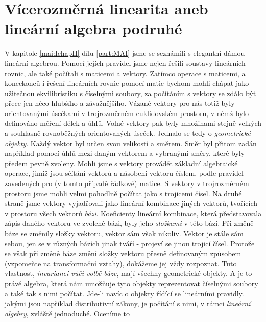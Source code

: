 \setchaptertoc
\chapter{Vícerozměrná linearita aneb lineární algebra podruhé}\label{mai:IIchapI}

  V kapitole \ref{mai:IchapII} dílu \ref{part:MAI} jsme se seznámili s elegantní dámou lineární
  algebrou. Pomocí jejích pravidel jsme nejen řešili soustavy lineárních rovnic, ale také počítali s
  maticemi a vektory. Zatímco operace s maticemi, a koneckonců i řešení lineárních rovnic pomocí
  matic bychom mohli chápat jako užitečnou ekvilibristiku s číselnými soubory, za počítáním s
  vektory se zdálo být přece jen něco hlubšího a závažnějšího. Vázané vektory pro nás totiž byly
  orientovanými úsečkami v trojrozměrném euklidovském prostoru, v němž bylo definováno měření délek
  a úhlů. Volné vektory pak byly množinami stejně velkých a souhlasně rovnoběžných orientovaných
  úseček. Jednalo se tedy o \emph{geometrické objekty}. Každý vektor byl určen svou velikostí a
  směrem. Směr byl přitom zadán například pomocí úhlů mezi daným vektorem a vybranými směry, které
  byly předem pevně zvoleny. Mohli jsme s vektory provádět základní algebraické operace, jimiž jsou
  sčítání vektorů a násobení vektoru číslem, podle pravidel zavedených pro (v tomto případě řádkové)
  matice. S vektory v trojrozměrném prostoru jsme mohli velmi pohodlně počítat jako s trojicemi
  čísel. Na druhé straně jsme vektory vyjadřovali jako lineární kombinace jiných vektorů, tvořících
  v prostoru všech vektorů \emph{bázi}. Koeficienty lineární kombinace, která představovala zápis
  daného vektoru ve zvolené bázi, byly jeho \emph{složkami} v této bázi. Při změně báze se změnily
  složky vektoru, vektor sám však nikoliv. Vektor je stále sám sebou, jen se v různých bázích jinak
  tváří - projeví se jinou trojicí čísel. Protože se však při změně báze změní složky vektoru přesně
  definovaným způsobem (vzpomeňte na transformační vztahy), dokážeme jej vždy rozpoznat. Tuto
  vlastnost, \emph{invarianci vůči volbě báze}, mají všechny geometrické objekty. A je to právě
  algebra, která nám umožňuje tyto objekty reprezentovat číselnými soubory a také tak s nimi
  počítat. Jde-li navíc o objekty řídící se lineárními pravidly. jakými jsou například distributivní
  zákony, je počítání s nimi, v rámci \emph{lineární algebry}, zvláště jednoduché. Oceníme to
